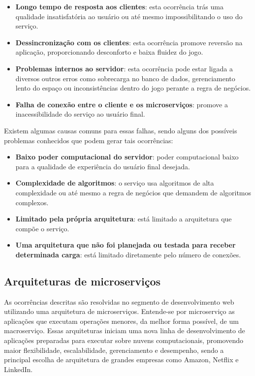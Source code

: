 \begin{itemize}
  \item \textbf{Longo tempo de resposta aos clientes}: esta ocorrência trás uma qualidade insatisfatória ao usuário ou até mesmo impossibilitando o uso do serviço.
  \item \textbf{Dessincronização com os clientes}: esta ocorrência promove reversão na aplicação, proporcionando desconforto e baixa fluidez do jogo.
  \item \textbf{Problemas internos ao servidor}: esta ocorrência pode estar ligada a diversos outros erros como sobrecarga no banco de dados, gerenciamento lento do espaço ou inconsistências dentro do jogo perante a regra de negócios.
  \item \textbf{Falha de conexão entre o cliente e os microserviços}: promove a inacessibilidade do serviço ao usuário final.
\end{itemize}

Existem algumas causas comuns para essas falhas, sendo alguns dos possíveis problemas conhecidos que podem gerar tais ocorrências\cite{1417630}:

\begin{itemize}
  \item \textbf{Baixo poder computacional do servidor}: poder computacional baixo para a qualidade de experiência do usuário final desejada.
  \item \textbf{Complexidade de algoritmos}: o serviço usa algoritmos de alta complexidade ou até mesmo a regra de negócios que demandem de algoritmos complexos.
  \item \textbf{Limitado pela própria arquitetura}: está limitado a arquitetura que compõe o serviço.
  \item \textbf{Uma arquitetura que não foi planejada ou testada para receber determinada carga}: está limitado diretamente pelo número de conexões.
\end{itemize}

\subsection{Arquiteturas de microserviços}

As ocorrências descritas são resolvidas no segmento de desenvolvimento web utilizando uma arquitetura de microserviços. Entende-se por microserviço as aplicações que executam operações menores, da melhor forma possível, de um macroserviço\cite{stephenclarkewillson2017}. Essas arquiteturas iniciam uma nova linha de desenvolvimento de aplicações preparadas para executar sobre nuvens computacionais, promovendo maior flexibilidade, escalabilidade, gerenciamento e desempenho, sendo a principal escolha de arquitetura de grandes empresas como Amazon, Netflix e LinkedIn\cite{7830692}\cite{7515686}.

